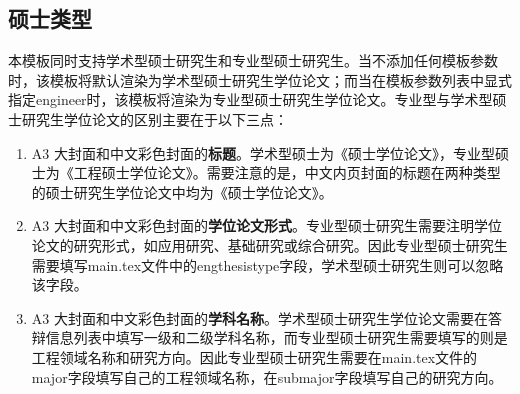 \subsection{硕士类型}

本模板同时支持学术型硕士研究生和专业型硕士研究生。当不添加任何模板参数时，该模板将默认渲染为学术型硕士研究生学位论文；而当在模板参数列表中显式指定{\codefont engineer}时，该模板将渲染为专业型硕士研究生学位论文。专业型与学术型硕士研究生学位论文的区别主要在于以下三点：
\begin{enumerate}
    \item A3 大封面和中文彩色封面的\textbf{标题}。学术型硕士为《硕士学位论文》，专业型硕士为《工程硕士学位论文》。需要注意的是，中文内页封面的标题在两种类型的硕士研究生学位论文中均为《硕士学位论文》。
    \item A3 大封面和中文彩色封面的\textbf{学位论文形式}。专业型硕士研究生需要注明学位论文的研究形式，如应用研究、基础研究或综合研究。因此专业型硕士研究生需要填写main.tex文件中的{\codefont engthesistype}字段，学术型硕士研究生则可以忽略该字段。
    \item A3 大封面和中文彩色封面的\textbf{学科名称}。学术型硕士研究生学位论文需要在答辩信息列表中填写一级和二级学科名称，而专业型硕士研究生需要填写的则是工程领域名称和研究方向。因此专业型硕士研究生需要在main.tex文件的{\codefont major}字段填写自己的工程领域名称，在{\codefont submajor}字段填写自己的研究方向。
\end{enumerate}